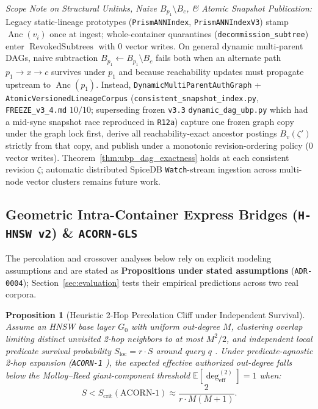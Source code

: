 \documentclass[conference]{IEEEtran}
\newtheorem{proposition}{Proposition}
\begin{document}
\textit{Scope Note on Structural Unlinks, Naive $B_{p_1} \setminus B_c$, \& Atomic Snapshot Publication:} Legacy static-lineage prototypes (\texttt{PrismANNIndex}, \texttt{PrismANNIndexV3}) stamp $\operatorname{Anc}(v_i)$ once at ingest; whole-container quarantines (\texttt{decommission\_subtree}) enter $\operatorname{RevokedSubtrees}$ with $0$ vector writes. On general dynamic multi-parent DAGs, naive subtraction $B_{p_1} \gets B_{p_1} \setminus B_c$ fails both when an alternate path $p_1 \to x \to c$ survives under $p_1$ and because reachability updates must propagate upstream to $\operatorname{Anc}(p_1)$. Instead, \texttt{DynamicMultiParentAuthGraph} + \texttt{AtomicVersionedLineageCorpus} (\texttt{consistent\_snapshot\_index.py}, \texttt{FREEZE\_v3\_4.md} $10/10$; superseding frozen \texttt{v3.3} \texttt{dynamic\_dag\_ubp.py} which had a mid-sync snapshot race reproduced in \texttt{R12a}) capture one frozen graph copy under the graph lock first, derive all reachability-exact ancestor postings $B_v(\zeta')$ strictly from that copy, and publish under a monotonic revision-ordering policy ($0$ vector writes). Theorem~\ref{thm:ubp_dag_exactness} holds at each consistent revision $\zeta$; automatic distributed SpiceDB \texttt{Watch}-stream ingestion across multi-node vector clusters remains future work.

\subsection{Geometric Intra-Container Express Bridges (\texttt{H-HNSW v2}) \& \texttt{ACORN-GLS}}
\label{sec:hhnsw}

The percolation and crossover analyses below rely on explicit modeling assumptions and are stated as \textbf{Propositions under stated assumptions} (\texttt{ADR-0004}); Section~\ref{sec:evaluation} tests their empirical predictions across two real corpora.

\setcounter{proposition}{1}
\begin{proposition}[Heuristic 2-Hop Percolation Cliff under Independent Survival]
\label{prop:percolation_cliff}
Assume an HNSW base layer $G_0$ with uniform out-degree $M$, clustering overlap limiting distinct unvisited 2-hop neighbors to at most $M^2/2$, and independent local predicate survival probability $S_{\text{loc}} = r \cdot S$ around query $q$ \cite{amanbayev2026gls}. Under predicate-agnostic 2-hop expansion (\texttt{ACORN-1} \cite{patel2024acorn}), the expected effective authorized out-degree falls below the Molloy--Reed giant-component threshold $\mathbb{E}[\deg_{\text{eff}}^{(2)}] = 1$ when:
\begin{equation}
\label{eq:s_crit_acorn1}
S < S_{\text{crit}}(\text{ACORN-1}) \approx \frac{2}{r \cdot M(M + 1)}.
\end{equation}
\end{proposition}
\end{document}
